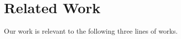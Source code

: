 \section{Related Work}\label{sec:related}
Our work is relevant to the following three lines of works.










